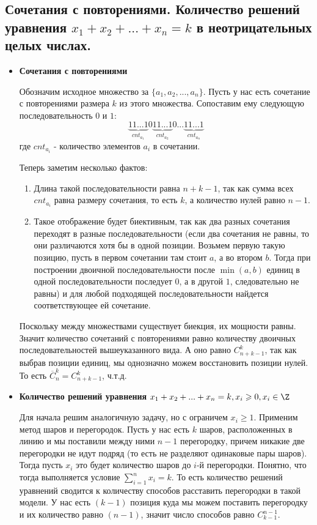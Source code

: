 \subsection{Сочетания с повторениями. Количество решений уравнения $x_1 + x_2 + ... + x_n = k$ в неотрицательных целых числах.}

\begin{itemize}
	\item \textbf{Сочетания с повторениями}
	
	Обозначим исходное множество за $\{a_1, a_2, ..., a_n\}$. Пусть у нас есть сочетание с повторениями размера $k$ из этого множества. Сопоставим ему следующую последовательность $0$ и $1$:
	$$\underbrace{11...1}_{cnt_{a_1}}0\underbrace{11...1}_{cnt_{a_2}}0...\underbrace{11...1}_{cnt_{a_n}}$$
	где $cnt_{a_i}$ - количество элементов $a_i$ в сочетании.
	
	Теперь заметим несколько фактов:
	\begin{enumerate}
		\item Длина такой последовательности равна $n + k - 1$, так как сумма всех $cnt_{a_i}$ равна размеру сочетания, то есть $k$, а количество нулей равно $n - 1$.
		\item Такое отображение будет биективным, так как два разных сочетания переходят в разные последовательности (если два сочетания не равны, то они различаются хотя бы в одной позиции. Возьмем первую такую позицию, пусть в первом сочетании там стоит $a$, а во втором $b$. Тогда при построении двоичной последовательности после $\min{(a, b)}$ единиц в одной последовательности последует $0$, а в другой $1$, следовательно не равны) и для любой подходящей последовательности найдется соответствующее ей сочетание.
	\end{enumerate}

	Поскольку между множествами существует биекция, их мощности равны. Значит количество сочетаний с повторениями равно количеству двоичных последовательностей вышеуказанного вида. А оно равно $C^k_{n+k-1}$, так как выбрав позиции единиц, мы однозначно можем восстановить позиции нулей. То есть $\overline C^k_n = C^k_{n+k-1}$, ч.т.д.
	
	\item \textbf{Количество решений уравнения $x_1 + x_2 + ... + x_n = k, x_i \geqslant 0, x_i \in \Z$}
	
	Для начала решим аналогичную задачу, но с ограничем $x_i \geqslant 1$. Применим метод шаров и перегородок. Пусть у нас есть $k$ шаров, расположенных в линию и мы поставили между ними $n - 1$ перегородку, причем никакие две перегородки не идут подряд (то есть не разделяют одинаковые пары шаров). Тогда пусть $x_i$ это будет количество шаров до $i$-й перегородки. Понятно, что тогда выполняется условие $\sum_{i=1}^{n}x_i = k$. То есть количество решений уравнений сводится к количеству способов расставить перегородки в такой модели. У нас есть $(k - 1)$ позиция куда мы можем поставить перегородку и их количество равно $(n - 1)$, значит число способов равно $C^{n-1}_{k-1}$.
	

\end{itemize}
